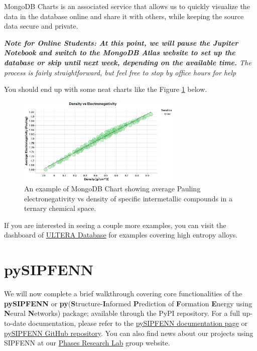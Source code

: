\label{pysipfenntutorial2:plotting-with-mongodb-charts}

MongoDB Charts is an associated service that allows us to quickly
visualize the data in the database online and share it with others,
while keeping the source data secure and private.

\emph{\textbf{Note for Online Students: At this point, we will pause the
Jupiter Notebook and switch to the MongoDB Atlas website to set up the
database or skip until next week, depending on the available time.} The
process is fairly straightforward, but feel free to stop by office hours
for help}

You should end up with some neat charts like the Figure \ref{pysipfenntutorial2:MongoDBChartExample} below.

\begin{figure}[H]
    \centering
    \includegraphics[width=0.7\textwidth]{pysipfennTutorial2/MongoDBChartExample.png}
    \caption{An example of MongoDB Chart showing average Pauling electronegativity vs density of specific intermetallic compounds in a ternary chemical space.}
    \label{pysipfenntutorial2:MongoDBChartExample}
\end{figure}

If you are interested in seeing a couple more examples, you can visit
the dashboard of \href{https://ultera.org}{ULTERA Database} for examples covering high
entropy alloys.

\hypertarget{pysipfenn}{%
\section{pySIPFENN}\label{pysipfenntutorial2:pysipfenn}}

We will now complete a brief walkthrough covering core functionalities
of the \textbf{pySIPFENN} or
\textbf{py}(\textbf{S}tructure-\textbf{I}nformed \textbf{P}rediction of
\textbf{F}ormation \textbf{E}nergy using \textbf{N}eural
\textbf{N}etworks) package; available through the PyPI repository. For a
full up-to-date documentation, please refer to the
\href{https://pysipfenn.org}{pySIPFENN documentation page} or
\href{https://git.pysipfenn.org}{pySIPFENN GitHub repository}. You can
also find news about our projects using SIPFENN at our
\href{https://phaseslab.org}{Phases Research Lab} group website.


